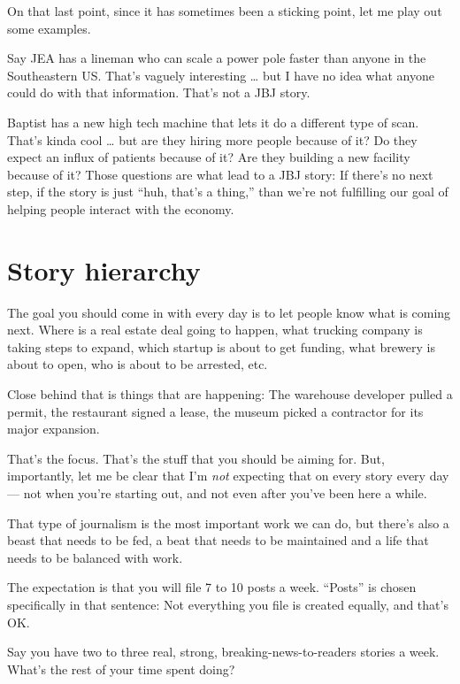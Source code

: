 \documentclass[
  12pt,
  american,
  letterpaperpaper,
  extrafontsizes,onecolumn,openright
  ]{memoir}
\begin{document}
On that last point, since it has sometimes been a sticking point, let me play out some examples.

Say JEA has a lineman who can scale a power pole faster than anyone in the Southeastern US. That's vaguely interesting \ldots{} but I have no idea what anyone could do with that information. That's not a JBJ story.

Baptist has a new high tech machine that lets it do a different type of scan. That's kinda cool \ldots{} but are they hiring more people because of it? Do they expect an influx of patients because of it? Are they building a new facility because of it? Those questions are what lead to a JBJ story: If there's no next step, if the story is just \enquote{huh, that's a thing,} than we're not fulfilling our goal of helping people interact with the economy.

\hypertarget{story-hierarchy}{%
\section*{Story hierarchy}\label{story-hierarchy}}

The goal you should come in with every day is to let people know what is coming next. Where is a real estate deal going to happen, what trucking company is taking steps to expand, which startup is about to get funding, what brewery is about to open, who is about to be arrested, etc.

Close behind that is things that are happening: The warehouse developer pulled a permit, the restaurant signed a lease, the museum picked a contractor for its major expansion.

That's the focus. That's the stuff that you should be aiming for. But, importantly, let me be clear that I'm \emph{not} expecting that on every story every day --- not when you're starting out, and not even after you've been here a while.

That type of journalism is the most important work we can do, but there's also a beast that needs to be fed, a beat that needs to be maintained and a life that needs to be balanced with work.

The expectation is that you will file 7 to 10 posts a week. \enquote{Posts} is chosen specifically in that sentence: Not everything you file is created equally, and that's OK.

Say you have two to three real, strong, breaking-news-to-readers stories a week. What's the rest of your time spent doing?
\end{document}
